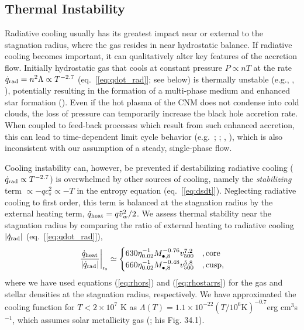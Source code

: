 \documentclass[usenatbib,fleqn]{mn2e}
\begin{document}
\subsection{Thermal Instability}
\label{sec:instability}

Radiative cooling usually has its greatest impact near or external to
the stagnation radius, where the gas resides in near hydrostatic
balance.  If radiative cooling becomes important, it can qualitatively
alter key features of the accretion flow. Initially hydrostatic gas
that cools at constant pressure $P \propto nT$ at the rate
$\dot{q}_{\rm rad} = n^{2}\Lambda \propto T^{-2.7}$
(eq.~[\ref{eq:qdot_rad}]; see below) is thermally unstable
(e.g., \citealt{McCourt+12}, \citealt{Li&Bryan14a}), potentially resulting
in the formation of a multi-phase medium and enhanced star formation (\citealt{Li&Bryan14b}).
Even if the hot plasma of the CNM does not condense into cold clouds,
the loss of pressure can temporarily increase the black hole accretion
rate.  When coupled to feed-back processes which result from such enhanced accretion, this can lead to
time-dependent limit cycle behavior
(e.g.~\citealt{Ciotti&Ostriker07}; \citealt{Ciotti+10};
\citealt{Yuan&Li11}, \citealt{Gan+14}), which is also inconsistent
with our assumption of a steady, single-phase flow.

Cooling instability can, however, be prevented if destabilizing radiative cooling ($\dot{q}_{\rm rad} \propto T^{-2.7}$) is overwhelmed by
other sources of cooling, namely the {\it stabilizing} term $\propto -q c_{s}^{2}
\propto -T$ in the entropy equation (eq.~[\ref{eq:dsdt}]).
Neglecting radiative cooling to first order, this term is balanced at the stagnation
radius by the external heating term, $\dot{q}_{\rm heat} = q
\tilde{v}_{w}^{2}/2$.  We assess thermal stability near the stagnation radius by comparing the ratio of external heating to
radiative cooling $|\dot{q}_{\rm rad}|$ (eq.~[\ref{eq:qdot_rad}]),
\begin{align}
\left.\frac{\dot{q}_{\rm heat}}{|\dot{q}_{\rm rad}|}\right|_{\rm r_{\rm s}} \simeq
  \begin{cases}
   630 \eta_{0.02}^{-1} M_{\bullet,8}^{-0.76}v_{500}^{7.2}  &, \text{core}\\
   660 \eta_{0.02}^{-1} M_{\bullet,8}^{-0.48}v_{500}^{5.8}  &, \text{cusp},     
  \end{cases}
  \label{eq:cooling2}
\end{align}
where we have used equations (\ref{eq:rhors}) and (\ref{eq:rhostarrs})
for the gas and stellar densities at the stagnation radius,
respectively.  We have approximated the cooling function for $T <
2\times 10^{7}$ K as $\Lambda(T) = 1.1 \times 10^{-22} \left(T/10^6
  \text{K}\right)^{-0.7} $erg cm$^3 $s$^{-1}$, which assumes solar
metallicity gas (\citealt{Draine:2011a}; his Fig. 34.1).
\end{document}
